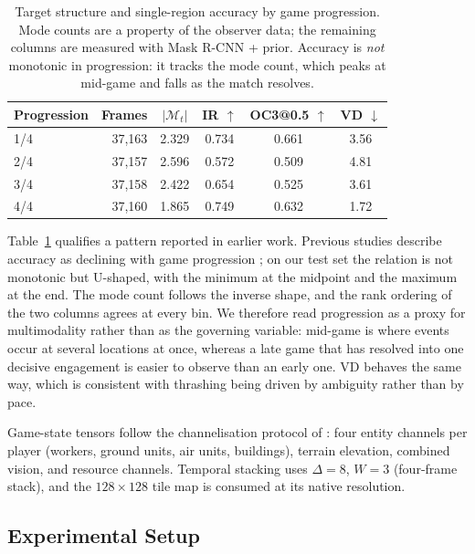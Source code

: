 \documentclass[preprint,12pt]{elsarticle}
\begin{document}
\begin{table}[t]
  \centering
  \caption{Target structure and single-region accuracy by game progression.
  Mode counts are a property of the observer data; the remaining columns are
  measured with Mask R-CNN + prior. Accuracy is \emph{not} monotonic in
  progression: it tracks the mode count, which peaks at mid-game and falls as
  the match resolves.}
  \label{tab:by_progression}
  \begin{tabular}{lrcccc}
    \toprule
    Progression & Frames & $|\mathcal{M}_t|$ & IR $\uparrow$
      & OC3@0.5 $\uparrow$ & VD $\downarrow$ \\
    \midrule
    1/4 & 37{,}163 & 2.329 & 0.734 & 0.661 & 3.56 \\
    2/4 & 37{,}157 & 2.596 & 0.572 & 0.509 & 4.81 \\
    3/4 & 37{,}158 & 2.422 & 0.654 & 0.525 & 3.61 \\
    4/4 & 37{,}160 & 1.865 & 0.749 & 0.632 & 1.72 \\
    \bottomrule
  \end{tabular}
\end{table}

Table~\ref{tab:by_progression} qualifies a pattern reported in earlier work.
Previous studies describe accuracy as declining with game progression
\cite{joo2023learning, anonymous2025kbrs}; on our test set the relation is not
monotonic but U-shaped, with the minimum at the midpoint and the maximum at the
end. The mode count follows the inverse shape, and the rank ordering of the two
columns agrees at every bin. We therefore read progression as a proxy for
multimodality rather than as the governing variable: mid-game is where events
occur at several locations at once, whereas a late game that has resolved into
one decisive engagement is easier to observe than an early one. VD behaves the
same way, which is consistent with thrashing being driven by ambiguity rather
than by pace.

Game-state tensors follow the channelisation protocol of \cite{bae2025observer}:
four entity channels per player (workers, ground units, air units, buildings),
terrain elevation, combined vision, and resource channels. Temporal stacking
uses $\Delta=8$, $W=3$ (four-frame stack), and the $128 \times 128$ tile map
is consumed at its native resolution.

\subsection{Experimental Setup}
\end{document}

